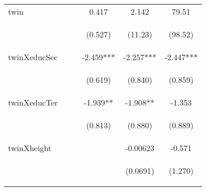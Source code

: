 \begin{table}[htpb!]
\begin{center}
{\begin{tabular}{lccccc}
twin &  &  & 0.417 & 2.142 & 79.51 \\
\vspace{4pt} & \begin{footnotesize}\end{footnotesize} & \begin{footnotesize}\end{footnotesize} & \begin{footnotesize}(0.527)\end{footnotesize} & \begin{footnotesize}(11.23)\end{footnotesize} & \begin{footnotesize}(98.52)\end{footnotesize} \\
twinXeducSec &  &  & -2.459*** & -2.257*** & -2.447*** \\
\vspace{4pt} & \begin{footnotesize}\end{footnotesize} & \begin{footnotesize}\end{footnotesize} & \begin{footnotesize}(0.619)\end{footnotesize} & \begin{footnotesize}(0.840)\end{footnotesize} & \begin{footnotesize}(0.859)\end{footnotesize} \\
twinXeducTer &  &  & -1.939** & -1.908** & -1.353 \\
\vspace{4pt} & \begin{footnotesize}\end{footnotesize} & \begin{footnotesize}\end{footnotesize} & \begin{footnotesize}(0.813)\end{footnotesize} & \begin{footnotesize}(0.880)\end{footnotesize} & \begin{footnotesize}(0.889)\end{footnotesize} \\
twinXheight &  &  &  & -0.00623 & -0.571 \\
\vspace{4pt} & \begin{footnotesize}\end{footnotesize} & \begin{footnotesize}\end{footnotesize} & \begin{footnotesize}\end{footnotesize} & \begin{footnotesize}(0.0691)\end{footnotesize} & \begin{footnotesize}(1.270)\end{footnotesize} \\

\end{tabular}}
\end{center}
\end{table}
